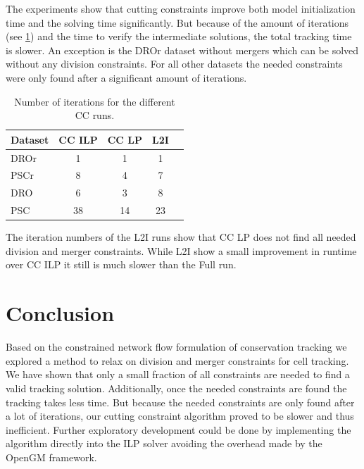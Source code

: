 \documentclass[10pt,twocolumn,letterpaper]{article}
\begin{document}
    The experiments show that cutting constraints improve both model initialization time and the solving time significantly. But because of the amount of iterations (see \cref{tab:iter}) and the time to verify the intermediate solutions, the total tracking time is slower. An exception is the DROr dataset without mergers which can be solved without any division constraints. For all other datasets the needed constraints were only found after a significant amount of iterations.

\begin{table}
  \begin{center}
  \begin{tabular}{|l||c|c|c|c|}
    \hline
    Dataset & CC ILP & CC LP & L2I\\
    \hline\hline
    DROr & 1 & 1 & 1 \\
    PSCr & 8 & 4 & 7 \\
    DRO & 6 & 3 & 8 \\
    PSC & 38 & 14 & 23 \\
    \hline
  \end{tabular}
  \end{center}
  \caption{Number of iterations for the different CC runs.}
  \label{tab:iter}
\end{table}

The iteration numbers of the L2I runs show that CC LP does not find all needed division and merger constraints. While L2I show a small improvement in runtime over CC ILP it still is much slower than the Full run.

\section{Conclusion}

Based on the constrained network flow formulation of conservation tracking we explored a method to relax on division and merger constraints for cell tracking. We have shown that only a small fraction of all constraints are needed to find a valid tracking solution. Additionally, once the needed constraints are found the tracking takes less time. But because the needed constraints are only found after a lot of iterations, our cutting constraint algorithm proved to be slower and thus inefficient. Further exploratory development could be done by implementing the algorithm directly into the ILP solver avoiding the overhead made by the OpenGM framework.


{\small


}
\end{document}
